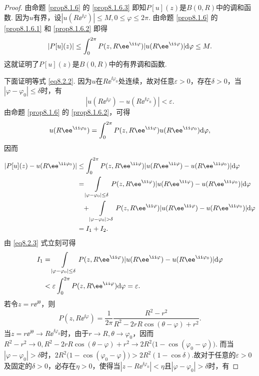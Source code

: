 \begin{proof}
由命题 \ref{prop8.1.6} 的 \ref{prop8.1.6.3} 即知$P[u](z)$是$B(0,R)$中的调和函数. 因为$u$有界，设$|u(R\ee^{\ii\varphi})|\le M,0\le\varphi\le2\pi$. 由命题 \ref{prop8.1.6} 的 \ref{prop8.1.6.1} 和 \ref{prop8.1.6.2} 即得
\[|P[u](z)|\le\int_0^{2\pi}P(z,R\ee^{\ii\varphi})|u(R\ee^{\ii\varphi})|\textrm d\varphi\le M.\]
这就证明了$P[u](z)$是$B(0,R)$中的有界调和函数.

下面证明等式 \eqref{eq8.2.2}. 因为$u$在$R\ee^{\ii\varphi_0}$处连续，故对任意$\varepsilon>0$，存在$\delta>0$，当$|\varphi-\varphi_0|\le\delta$时，有
\begin{equation}\label{eq8.2.3}
|u(R\ee^{\ii\varphi})-u(R\ee^{\ii\varphi_0})|<\varepsilon.
\end{equation}
由命题 \ref{prop8.1.6} 的 \ref{prop8.1.6.2}，可得
\[u(R\ee^{\ii\varphi_0})=\int_0^{2\pi}P(z,R\ee^{\ii\varphi})u(R\ee^{\ii\varphi_0})
\textrm d\varphi,\]
因而
\begin{align*}
|P[u](z)-u(R\ee^{\ii\varphi_0})|&\le\int_0^{2\pi}P(z,R\ee^{\ii\varphi})|u(R\ee^{\ii\varphi})-u(R\ee^{\ii\varphi_0})|
\textrm d\varphi\\
&=\int\limits_{|\varphi-\varphi_0|\le\delta}P(z,R\ee^{\ii\varphi})|u(R\ee^{\ii\varphi})
-u(R\ee^{\ii\varphi_0})|\textrm d\varphi\\
&\phantom{=}+\int\limits_{|\varphi-\varphi_0|>\delta}P(z,R\ee^{\ii\varphi})|u(R\ee^{\ii\varphi})
-u(R\ee^{\ii\varphi_0})|\textrm d\varphi\\
&=I_1+I_2.
\end{align*}
由 \eqref{eq8.2.3} 式立刻可得
\begin{equation}\label{eq8.2.4}
\begin{aligned}
I_1&=\int\limits_{|\varphi-\varphi_0|\le\delta}P(z,R\ee^{\ii\varphi})|u(R\ee^{\ii\varphi})
-u(R\ee^{\ii\varphi_0})|\textrm d\varphi\\
&<\varepsilon\int_0^{2\pi}P(z,R\ee^{\ii\varphi})\textrm d\varphi=\varepsilon.
\end{aligned}
\end{equation}
若令$z=r\ee^{\ii\theta}$，则
\[P(z,R\ee^{\ii\varphi})=\frac1{2\pi}\frac{R^2-r^2}{R^2-2rR\cos(\theta-\varphi)+r^2}.\]
当$z=r\ee^{\ii\theta}\to R\ee^{\ii\varphi_0}$时，由于$r\to R,\theta\to\varphi_0$，因而$R^2-r^2\to0,R^2-2rR\cos(\theta-\varphi)+r^2\to2R^2\big(1-\cos(\varphi_0-\varphi)\big)$. 而当$|\varphi-\varphi_0|>\delta$时，$2R^2\big(1-\cos(\varphi_0-\varphi)\big)>2R^2(1-\cos\delta)$.故对于任意的$\varepsilon>0$及固定的$\delta>0$，必存在$\eta>0$，使得当$|z-R\ee^{\ii\varphi_0}|<\eta$且$|\varphi-\varphi_0|>\delta$时，有

\end{proof}
